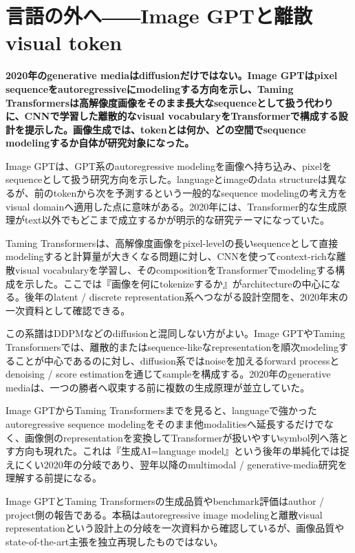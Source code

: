 \section{言語の外へ――Image GPTと離散visual token}
\noindent\textbf{2020年のgenerative mediaはdiffusionだけではない。Image GPTはpixel sequenceをautoregressiveにmodelingする方向を示し、Taming Transformersは高解像度画像をそのまま長大なsequenceとして扱う代わりに、CNNで学習した離散的なvisual vocabularyをTransformerで構成する設計を提示した。画像生成では、tokenとは何か、どの空間でsequence modelingするか自体が研究対象になった。}\autocite{src-03b656c5d291,src-d46ff01d5c8d}

Image GPTは、GPT系のautoregressive modelingを画像へ持ち込み、pixelをsequenceとして扱う研究方向を示した。languageとimageのdata structureは異なるが、前のtokenから次を予測するという一般的なsequence modelingの考え方をvisual domainへ適用した点に意味がある。2020年には、Transformer的な生成原理がtext以外でもどこまで成立するかが明示的な研究テーマになっていた。\autocite{src-d46ff01d5c8d}


Taming Transformersは、高解像度画像をpixel-levelの長いsequenceとして直接modelingすると計算量が大きくなる問題に対し、CNNを使ってcontext-richな離散visual vocabularyを学習し、そのcompositionをTransformerでmodelingする構成を示した。ここでは『画像を何にtokenizeするか』がarchitectureの中心になる。後年のlatent / discrete representation系へつながる設計空間を、2020年末の一次資料として確認できる。\autocite{src-03b656c5d291}


この系譜はDDPMなどのdiffusionと混同しない方がよい。Image GPTやTaming Transformersでは、離散的またはsequence-likeなrepresentationを順次modelingすることが中心であるのに対し、diffusion系ではnoiseを加えるforward processとdenoising / score estimationを通じてsampleを構成する。2020年のgenerative mediaは、一つの勝者へ収束する前に複数の生成原理が並立していた。\autocite{src-03b656c5d291,src-d46ff01d5c8d}


Image GPTからTaming Transformersまでを見ると、languageで強かったautoregressive sequence modelingをそのまま他modalitiesへ延長するだけでなく、画像側のrepresentationを変換してTransformerが扱いやすいsymbol列へ落とす方向も現れた。これは『生成AI=language model』という後年の単純化では捉えにくい2020年の分岐であり、翌年以降のmultimodal / generative-media研究を理解する前提になる。\autocite{src-03b656c5d291,src-d46ff01d5c8d}


\begin{claimboundary}
Image GPTとTaming Transformersの生成品質やbenchmark評価はauthor / project側の報告である。本稿はautoregressive image modelingと離散visual representationという設計上の分岐を一次資料から確認しているが、画像品質やstate-of-the-art主張を独立再現したものではない。\autocite{src-03b656c5d291,src-d46ff01d5c8d}
\end{claimboundary}
